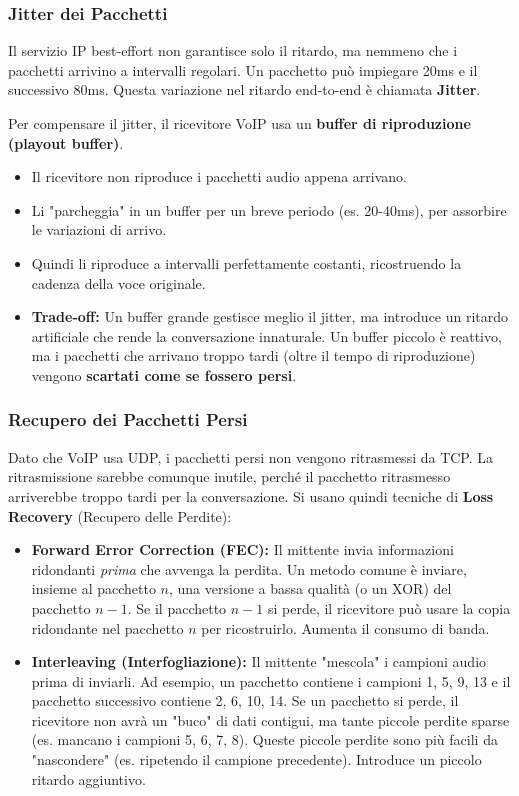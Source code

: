 \subsubsection{Jitter dei Pacchetti}
Il servizio IP best-effort non garantisce solo il ritardo, ma nemmeno che i pacchetti arrivino a intervalli regolari. Un pacchetto può impiegare 20ms e il successivo 80ms. Questa variazione nel ritardo end-to-end è chiamata \textbf{Jitter}.

Per compensare il jitter, il ricevitore VoIP usa un \textbf{buffer di riproduzione (playout buffer)}.
\begin{itemize}
    \item Il ricevitore non riproduce i pacchetti audio appena arrivano.
    \item Li "parcheggia" in un buffer per un breve periodo (es. 20-40ms), per assorbire le variazioni di arrivo.
    \item Quindi li riproduce a intervalli perfettamente costanti, ricostruendo la cadenza della voce originale.
    \item \textbf{Trade-off:} Un buffer grande gestisce meglio il jitter, ma introduce un ritardo artificiale che rende la conversazione innaturale. Un buffer piccolo è reattivo, ma i pacchetti che arrivano troppo tardi (oltre il tempo di riproduzione) vengono \textbf{scartati come se fossero persi}.
\end{itemize}

\subsubsection{Recupero dei Pacchetti Persi}
Dato che VoIP usa UDP, i pacchetti persi non vengono ritrasmessi da TCP. La ritrasmissione sarebbe comunque inutile, perché il pacchetto ritrasmesso arriverebbe troppo tardi per la conversazione. Si usano quindi tecniche di \textbf{Loss Recovery} (Recupero delle Perdite):
\begin{itemize}
    \item \textbf{Forward Error Correction (FEC):} Il mittente invia informazioni ridondanti \textit{prima} che avvenga la perdita. Un metodo comune è inviare, insieme al pacchetto $n$, una versione a bassa qualità (o un XOR) del pacchetto $n-1$. Se il pacchetto $n-1$ si perde, il ricevitore può usare la copia ridondante nel pacchetto $n$ per ricostruirlo. Aumenta il consumo di banda.
    \item \textbf{Interleaving (Interfogliazione):} Il mittente "mescola" i campioni audio prima di inviarli. Ad esempio, un pacchetto contiene i campioni 1, 5, 9, 13 e il pacchetto successivo contiene 2, 6, 10, 14. Se un pacchetto si perde, il ricevitore non avrà un "buco" di dati contigui, ma tante piccole perdite sparse (es. mancano i campioni 5, 6, 7, 8). Queste piccole perdite sono più facili da "nascondere" (es. ripetendo il campione precedente). Introduce un piccolo ritardo aggiuntivo.
\end{itemize}

